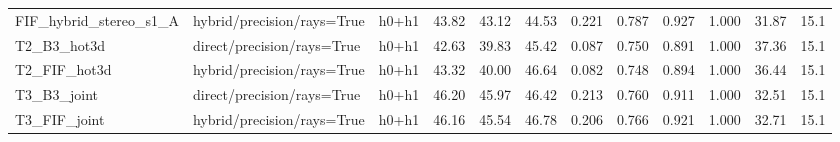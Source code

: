 \begin{tabular}{llrrrrrrrrrr}
FIF\_hybrid\_stereo\_s1\_A & hybrid/precision/rays=True & h0+h1 & 43.82 & 43.12 & 44.53 & 0.221 & 0.787 & 0.927 & 1.000 & 31.87 & 15.1 \\
T2\_B3\_hot3d & direct/precision/rays=True & h0+h1 & 42.63 & 39.83 & 45.42 & 0.087 & 0.750 & 0.891 & 1.000 & 37.36 & 15.1 \\
T2\_FIF\_hot3d & hybrid/precision/rays=True & h0+h1 & 43.32 & 40.00 & 46.64 & 0.082 & 0.748 & 0.894 & 1.000 & 36.44 & 15.1 \\
T3\_B3\_joint & direct/precision/rays=True & h0+h1 & 46.20 & 45.97 & 46.42 & 0.213 & 0.760 & 0.911 & 1.000 & 32.51 & 15.1 \\
T3\_FIF\_joint & hybrid/precision/rays=True & h0+h1 & 46.16 & 45.54 & 46.78 & 0.206 & 0.766 & 0.921 & 1.000 & 32.71 & 15.1 \\
\bottomrule
\end{tabular}
